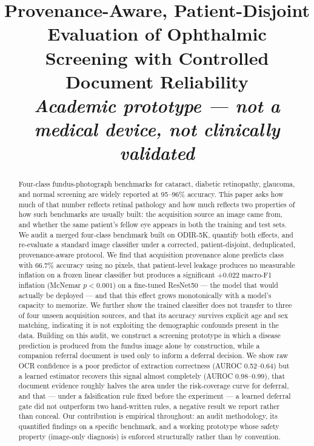 \documentclass[conference]{IEEEtran}
\begin{document}
\title{Provenance-Aware, Patient-Disjoint Evaluation of Ophthalmic Screening with Controlled Document Reliability\\
\large\normalfont\itshape Academic prototype --- not a medical device, not clinically validated}

\author{
}

\maketitle

\begin{abstract}
Four-class fundus-photograph benchmarks for cataract, diabetic retinopathy,
glaucoma, and normal screening are widely reported at 95--96\% accuracy. This
paper asks how much of that number reflects retinal pathology and how much
reflects two properties of how such benchmarks are usually built: the
acquisition source an image came from, and whether the same patient's fellow
eye appears in both the training and test sets. We audit a merged four-class
benchmark built on ODIR-5K, quantify both effects, and re-evaluate a standard
image classifier under a corrected, patient-disjoint, deduplicated,
provenance-aware protocol. We find that acquisition provenance alone predicts
class with 66.7\% accuracy using no pixels, that patient-level leakage
produces no measurable inflation on a frozen linear classifier but produces a
significant $+0.022$ macro-F1 inflation (McNemar $p<0.001$) on a fine-tuned
ResNet50 --- the model that would actually be deployed --- and that this
effect grows monotonically with a model's capacity to memorize. We further
show the trained classifier does not transfer to three of four unseen
acquisition sources, and that its accuracy survives explicit age and sex
matching, indicating it is not exploiting the demographic confounds present
in the data. Building on this audit, we construct a screening prototype in
which a disease prediction is produced from the fundus image alone by
construction, while a companion referral document is used only to inform a
deferral decision. We show raw OCR confidence is a poor predictor of
extraction correctness (AUROC 0.52--0.64) but a learned estimator recovers
this signal almost completely (AUROC 0.98--0.99), that document evidence
roughly halves the area under the risk-coverage curve for deferral, and
that --- under a falsification rule fixed before the experiment --- a
learned deferral gate did not outperform two hand-written rules, a negative
result we report rather than conceal. Our contribution is empirical
throughout: an audit methodology, its quantified findings on a specific
benchmark, and a working prototype whose safety property (image-only
diagnosis) is enforced structurally rather than by convention.
\end{abstract}
\end{document}
